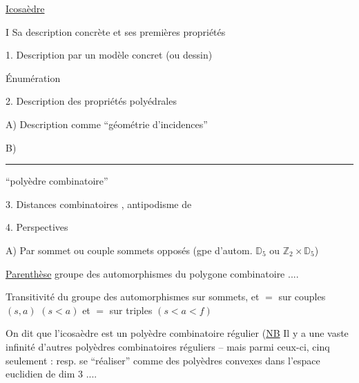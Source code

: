 
\uline{Icosaèdre}

I Sa description concrète et ses premières propriétés

1. Description  par un modèle concret (ou dessin)

 Énumération


2. Description des propriétés polyédrales


A) Description comme ``géométrie d'incidences''

B) \rule{3cm}{0.35pt} ``polyèdre combinatoire'' 

3. Distances combinatoires \unsure{,}  , antipodisme de 

4. Perspectives

A) Par sommet ou couple sommets opposés (gpe d'autom. $\mathbb D_5$ ou $\mathbb Z_2\times\mathbb D_5$)


\uline{Parenthèse} groupe des automorphismes du polygone combinatoire ....

Transitivité du groupe des automorphismes sur sommets, et $=$ sur couples $(s,a)$ $(s<a)$ et $=$ sur triples $(s<a<f)$

On dit que l'icosaèdre est un polyèdre combinatoire régulier (\uline{NB} Il y a une vaste infinité d'autres polyèdres combinatoires réguliers -- mais parmi ceux-ci, cinq seulement : resp.  se ``réaliser'' comme des polyèdres convexes dans l'espace euclidien de dim 3 ....


